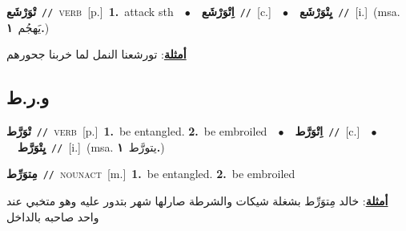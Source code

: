 \documentclass[10pt,a4paper,twoside]{article} %
\begin{document}
\begin{multicols}{2}
{\setlength\topsep{0pt}\textbf{\foreignlanguage{arabic}{تْوَرْشَع}}\ {\color{gray}\texttt{//}\color{black}}\ \textsc{verb}\ [p.]\ \textbf{1.}~attack sth\ \ $\bullet$\ \ \setlength\topsep{0pt}\textbf{\foreignlanguage{arabic}{اِتْوَرْشَع}}\ {\color{gray}\texttt{//}\color{black}}\ [c.]\ \ $\bullet$\ \ \setlength\topsep{0pt}\textbf{\foreignlanguage{arabic}{يِتْوَرْشَع}}\ {\color{gray}\texttt{//}\color{black}}\ [i.]\ \color{gray}(msa. \foreignlanguage{arabic}{يَهجُم}~\foreignlanguage{arabic}{\textbf{١.}})\color{black}\  \begin{flushright}\color{gray}\foreignlanguage{arabic}{\textbf{\underline{\foreignlanguage{arabic}{أمثلة}}}: تورشعنا النمل لما خربنا جحورهم}\end{flushright}\color{black}} \vspace{2mm}

\vspace{-3mm}
\subsection*{\color{blue}\foreignlanguage{arabic}{و.ر.ط}\color{blue}{}} 

{\setlength\topsep{0pt}\textbf{\foreignlanguage{arabic}{تْوَرَّط}}\ {\color{gray}\texttt{//}\color{black}}\ \textsc{verb}\ [p.]\ \textbf{1.}~be entangled.  \textbf{2.}~be embroiled\ \ $\bullet$\ \ \setlength\topsep{0pt}\textbf{\foreignlanguage{arabic}{اِتْوَرَّط}}\ {\color{gray}\texttt{//}\color{black}}\ [c.]\ \ $\bullet$\ \ \setlength\topsep{0pt}\textbf{\foreignlanguage{arabic}{يِتْوَرَّط}}\ {\color{gray}\texttt{//}\color{black}}\ [i.]\ \color{gray}(msa. \foreignlanguage{arabic}{يتورَّط}~\foreignlanguage{arabic}{\textbf{١.}})\color{black}\ } \vspace{2mm}

{\setlength\topsep{0pt}\textbf{\foreignlanguage{arabic}{مِتوَرِّط}}\ {\color{gray}\texttt{//}\color{black}}\ \textsc{noun\textunderscore act}\ [m.]\ \textbf{1.}~be entangled.  \textbf{2.}~be embroiled\  \begin{flushright}\color{gray}\foreignlanguage{arabic}{\textbf{\underline{\foreignlanguage{arabic}{أمثلة}}}: خالد مِتوَرِّط بشغلة شيكات والشرطة صارلها شهر بتدور عليه وهو متخبي عند واحد صاحبه بالداخل}\end{flushright}\color{black}} \vspace{2mm}


\end{multicols}
\end{document}
